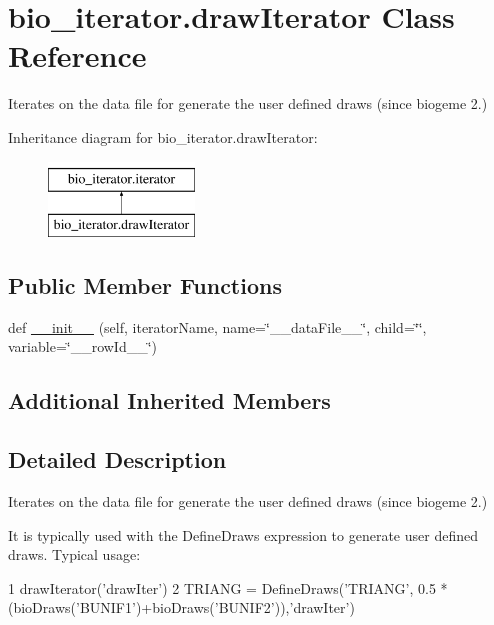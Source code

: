 \hypertarget{classbio__iterator_1_1draw_iterator}{}\section{bio\+\_\+iterator.\+draw\+Iterator Class Reference}
\label{classbio__iterator_1_1draw_iterator}


Iterates on the data file for generate the user defined draws (since biogeme 2.)  


Inheritance diagram for bio\+\_\+iterator.\+draw\+Iterator\+:\begin{figure}[H]
\begin{center}
\leavevmode
\includegraphics[height=2.000000cm]{classbio__iterator_1_1draw_iterator}
\end{center}
\end{figure}
\subsection*{Public Member Functions}
\begin{DoxyCompactItemize}
\item 
def \hyperlink{classbio__iterator_1_1draw_iterator_a09538e110b5cbce26caca6684846e71b}{\+\_\+\+\_\+init\+\_\+\+\_\+} (self, iterator\+Name, name=\char`\"{}\+\_\+\+\_\+data\+File\+\_\+\+\_\+\char`\"{}, child=\char`\"{}\char`\"{}, variable=\char`\"{}\+\_\+\+\_\+row\+Id\+\_\+\+\_\+\char`\"{})
\end{DoxyCompactItemize}
\subsection*{Additional Inherited Members}


\subsection{Detailed Description}
Iterates on the data file for generate the user defined draws (since biogeme 2.) 

It is typically used with the Define\+Draws expression to generate user defined draws. Typical usage\+: 
\begin{DoxyCode}
1 drawIterator(\textcolor{stringliteral}{'drawIter'}) 
2 TRIANG = DefineDraws(\textcolor{stringliteral}{'TRIANG'}, 0.5 * (bioDraws(\textcolor{stringliteral}{'BUNIF1'})+bioDraws(\textcolor{stringliteral}{'BUNIF2'})),\textcolor{stringliteral}{'drawIter'})
\end{DoxyCode}
 

